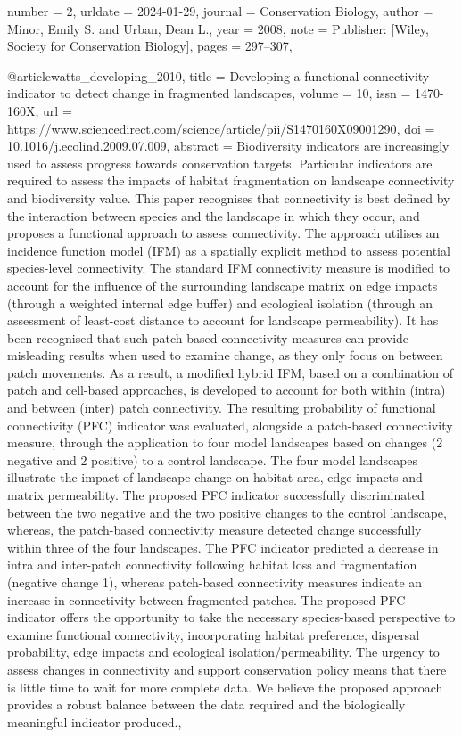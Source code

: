 {{{{	number = {2},
	urldate = {2024-01-29},
	journal = {Conservation Biology},
	author = {Minor, Emily S. and Urban, Dean L.},
	year = {2008},
	note = {Publisher: [Wiley, Society for Conservation Biology]},
	pages = {297--307},
}

@article{watts_developing_2010,
	title = {Developing a functional connectivity indicator to detect change in fragmented landscapes},
	volume = {10},
	issn = {1470-160X},
	url = {https://www.sciencedirect.com/science/article/pii/S1470160X09001290},
	doi = {10.1016/j.ecolind.2009.07.009},
	abstract = {Biodiversity indicators are increasingly used to assess progress towards conservation targets. Particular indicators are required to assess the impacts of habitat fragmentation on landscape connectivity and biodiversity value. This paper recognises that connectivity is best defined by the interaction between species and the landscape in which they occur, and proposes a functional approach to assess connectivity. The approach utilises an incidence function model (IFM) as a spatially explicit method to assess potential species-level connectivity. The standard IFM connectivity measure is modified to account for the influence of the surrounding landscape matrix on edge impacts (through a weighted internal edge buffer) and ecological isolation (through an assessment of least-cost distance to account for landscape permeability). It has been recognised that such patch-based connectivity measures can provide misleading results when used to examine change, as they only focus on between patch movements. As a result, a modified hybrid IFM, based on a combination of patch and cell-based approaches, is developed to account for both within (intra) and between (inter) patch connectivity. The resulting probability of functional connectivity (PFC) indicator was evaluated, alongside a patch-based connectivity measure, through the application to four model landscapes based on changes (2 negative and 2 positive) to a control landscape. The four model landscapes illustrate the impact of landscape change on habitat area, edge impacts and matrix permeability. The proposed PFC indicator successfully discriminated between the two negative and the two positive changes to the control landscape, whereas, the patch-based connectivity measure detected change successfully within three of the four landscapes. The PFC indicator predicted a decrease in intra and inter-patch connectivity following habitat loss and fragmentation (negative change 1), whereas patch-based connectivity measures indicate an increase in connectivity between fragmented patches. The proposed PFC indicator offers the opportunity to take the necessary species-based perspective to examine functional connectivity, incorporating habitat preference, dispersal probability, edge impacts and ecological isolation/permeability. The urgency to assess changes in connectivity and support conservation policy means that there is little time to wait for more complete data. We believe the proposed approach provides a robust balance between the data required and the biologically meaningful indicator produced.},
}}}}
